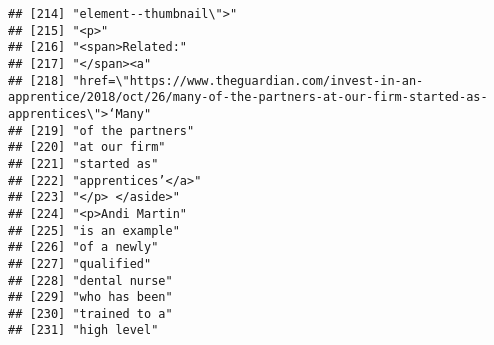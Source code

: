\documentclass[]{article}
\begin{document}
\begin{verbatim}
## [214] "element--thumbnail\">"                                                                                                                    
## [215] "<p>"                                                                                                                                      
## [216] "<span>Related:"                                                                                                                           
## [217] "</span><a"                                                                                                                                
## [218] "href=\"https://www.theguardian.com/invest-in-an-apprentice/2018/oct/26/many-of-the-partners-at-our-firm-started-as-apprentices\">‘Many"   
## [219] "of the partners"                                                                                                                          
## [220] "at our firm"                                                                                                                              
## [221] "started as"                                                                                                                               
## [222] "apprentices’</a>"                                                                                                                         
## [223] "</p> </aside>"                                                                                                                            
## [224] "<p>Andi Martin"                                                                                                                           
## [225] "is an example"                                                                                                                            
## [226] "of a newly"                                                                                                                               
## [227] "qualified"                                                                                                                                
## [228] "dental nurse"                                                                                                                             
## [229] "who has been"                                                                                                                             
## [230] "trained to a"                                                                                                                             
## [231] "high level"                                                                                                                               

\end{verbatim}
\end{document}

